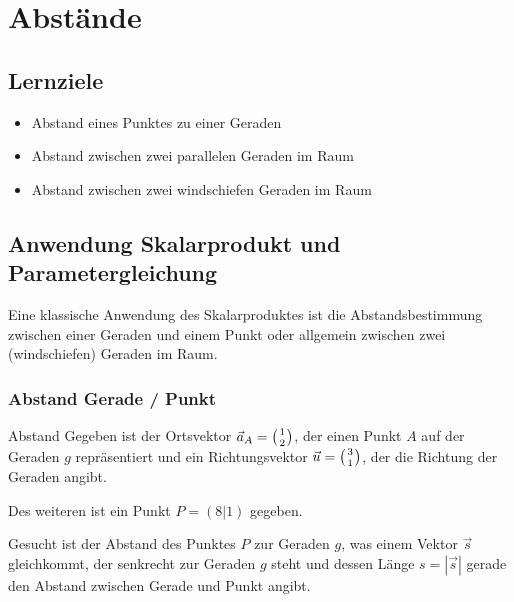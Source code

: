 \section{Abstände}

\subsection*{Lernziele}
\begin{itemize}
\item Abstand eines Punktes zu einer Geraden
\item Abstand zwischen zwei parallelen Geraden im Raum
\item Abstand zwischen zwei windschiefen Geraden im Raum
\end{itemize}

\newpage

\subsection{Anwendung Skalarprodukt und Parametergleichung}

Eine klassische Anwendung des Skalarproduktes ist die
Abstandsbestimmung zwischen einer Geraden und einem Punkt oder
allgemein zwischen zwei (windschiefen) Geraden im Raum.
\newpage

\subsubsection{Abstand Gerade / Punkt}

\begin{beispiel}{Abstand}{}
Gegeben ist der Ortsvektor $\vec{a}_A=\left(1 \atop 2\right)$, der
einen Punkt $A$ auf der
Geraden $g$ repräsentiert und ein Richtungsvektor
$\vec{u}=\left(3\atop 1\right)$, der
die Richtung der Geraden angibt.

Des weiteren ist ein Punkt $P=(8|1)$ gegeben.

Gesucht ist der Abstand des Punktes $P$ zur Geraden $g$, was einem Vektor
$\vec{s}$ gleichkommt, der senkrecht zur Geraden $g$ steht und dessen Länge
$s=|\vec{s}|$ gerade den Abstand zwischen Gerade und Punkt angibt.
\end{beispiel}

